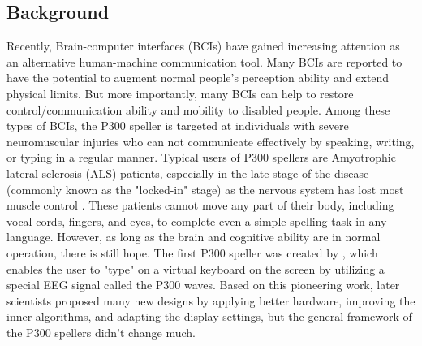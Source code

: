 \documentclass{article}
\begin{document}
\subsection{Background} \label{Background}
Recently, Brain-computer interfaces (BCIs) have gained increasing attention as an alternative human-machine communication tool. Many BCIs are reported to have the potential to augment normal people's perception ability and extend physical limits. But more importantly, many BCIs can help to restore control/communication ability and mobility to disabled people. Among these types of BCIs, the P300 speller is targeted at individuals with severe neuromuscular injuries who can not communicate effectively by speaking, writing, or typing in a regular manner. Typical users of P300 spellers are Amyotrophic lateral sclerosis (ALS) patients, especially in the late stage of the disease (commonly known as the "locked-in" stage) as the nervous system has lost most muscle control \cite{moghimi2013review}. These patients cannot move any part of their body, including vocal cords, fingers, and eyes, to complete even a simple spelling task in any language. However, as long as the brain and cognitive ability are in normal operation, there is still hope. The first P300 speller was created by \cite{farwell1988talking}, which enables the user to "type" on a virtual keyboard on the screen by utilizing a special EEG signal called the P300 waves. Based on this pioneering work, later scientists proposed many new designs by applying better hardware, improving the inner algorithms, and adapting the display settings, but the general framework of the P300 spellers didn't change much.\\
\end{document}
